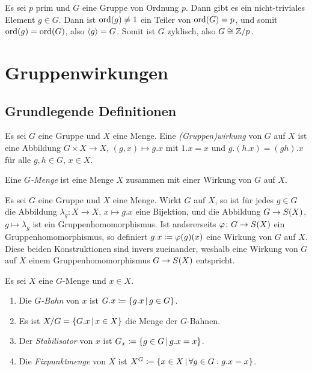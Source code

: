 \begin{example}
  Es sei $p$ prim und $G$ eine Gruppe von Ordnung $p$.
  Dann gibt es ein nicht-triviales Element $g \in G$.
  Dann ist $\operatorname{ord}(g) \neq 1$ ein Teiler von $\operatorname{ord}(G) = p$, und somit $\operatorname{ord}(g) = \operatorname{ord}(G)$, also $\langle g\rangle = G$.
  Somit ist $G$ zyklisch, also $G \cong \mathbb{Z}/p$.
\end{example}






\section{Gruppenwirkungen}



\subsection{Grundlegende Definitionen}

\begin{definition}
  Es sei $G$ eine Gruppe und $X$ eine Menge.
  Eine \emph{\textup(Gruppen\textup)wirkung} von $G$ auf $X$ ist eine Abbildung $G \times X \to X$, $(g,x) \mapsto g.x$ mit $1.x = x$ und $g.(h.x) = (gh).x$ für alle $g, h \in G$, $x \in X$.
  
  Eine \emph{$G$-Menge} ist eine Menge $X$ zusammen mit einer Wirkung von $G$ auf $X$.
\end{definition}

Es sei $G$ eine Gruppe und $X$ eine Menge.
Wirkt $G$ auf $X$, so ist für jedes $g \in G$ die Abbildung $\lambda_g \colon X \to X$, $x \mapsto g.x$ eine Bijektion, und die Abbildung $G \to S(X)$, $g \mapsto \lambda_g$ ist ein Gruppenhomomorphismus.
Ist andererseits $\varphi \colon G \to S(X)$ ein Gruppenhomomorphismus, so definiert $g.x \coloneqq \varphi(g)(x)$ eine Wirkung von $G$ auf $X$.
Diese beiden Konstruktionen sind invers zueinander, weshalb eine Wirkung von $G$ auf $X$ einem Gruppenhomomorphismus $G \to S(X)$ entspricht.

\begin{definition}
  Es sei $X$ eine $G$-Menge und $x \in X$.
  \begin{enumerate}
    \item
      Die \emph{$G$-Bahn} von $x$ ist $G.x \defined \{g.x \suchthat g \in G\}$.
    \item
      Es ist $X/G = \{G.x \suchthat x \in X\}$ die Menge der $G$-Bahnen.
    \item
      Der \emph{Stabilisator} von $x$ ist $G_x \defined \{g \in G \suchthat g.x = x\}$.
    \item
      Die \emph{Fixpunktmenge} von $X$ ist $X^G \defined \{x \in X \suchthat \forall g \in G: g.x = x\}$.
  \end{enumerate}
\end{definition}


